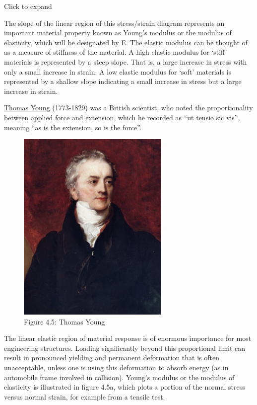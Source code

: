 \documentclass[
  letterpaper,
  DIV=11,
  numbers=noendperiod]{scrreprt}
\begin{document}
Click to expand

The slope of the linear region of this stress/strain diagram represents
an important material property known as Young's modulus or the modulus
of elasticity, which will be designated by E. The elastic modulus can be
thought of as a measure of stiffness of the material. A high elastic
modulus for `stiff' materials is represented by a steep slope. That is,
a large increase in stress with only a small increase in strain. A low
elastic modulus for `soft' materials is represented by a shallow slope
indicating a small increase in stress but a large increase in strain.

\href{https://en.wikipedia.org/wiki/Thomas_Young_(scientist)}{Thomas
Young} (1773-1829) was a British scientist, who noted the
proportionality between applied force and extension, which he recorded
as ``ut tensio sic vis'', meaning ``as is the extension, so is the
force''.

\begin{figure}[H]

{\centering \includegraphics[width=2.88542in,height=\textheight]{images/CH4 PNGs/4.5.jpeg}

}

\caption{Figure 4.5: Thomas Young}

\end{figure}%

The linear elastic region of material response is of enormous importance
for most engineering structures. Loading significantly beyond this
proportional limit can result in pronounced yielding and permanent
deformation that is often unacceptable, unless one is using this
deformation to absorb energy (as in automobile frame involved in
collision). Young's modulus or the modulus of elasticity is illustrated
in figure 4.5a, which plots a portion of the normal stress versus normal
strain, for example from a tensile test.
\end{document}
